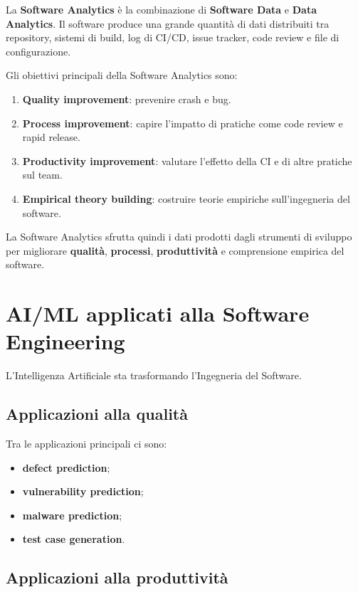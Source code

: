 La \textbf{Software Analytics} è la combinazione di \textbf{Software Data} e \textbf{Data Analytics}. Il software produce una grande quantità di dati distribuiti tra repository, sistemi di build, log di CI/CD, issue tracker, code review e file di configurazione.

Gli obiettivi principali della Software Analytics sono:
\begin{enumerate}
    \item \textbf{Quality improvement}: prevenire crash e bug.
    \item \textbf{Process improvement}: capire l'impatto di pratiche come code review e rapid release.
    \item \textbf{Productivity improvement}: valutare l'effetto della CI e di altre pratiche sul team.
    \item \textbf{Empirical theory building}: costruire teorie empiriche sull'ingegneria del software.
\end{enumerate}

La Software Analytics sfrutta quindi i dati prodotti dagli strumenti di sviluppo per migliorare \textbf{qualità}, \textbf{processi}, \textbf{produttività} e comprensione empirica del software.

\section{AI/ML applicati alla Software Engineering}

L'Intelligenza Artificiale sta trasformando l'Ingegneria del Software.

\subsection{Applicazioni alla qualità}

Tra le applicazioni principali ci sono:
\begin{itemize}
    \item \textbf{defect prediction};
    \item \textbf{vulnerability prediction};
    \item \textbf{malware prediction};
    \item \textbf{test case generation}.
\end{itemize}

\subsection{Applicazioni alla produttività}

